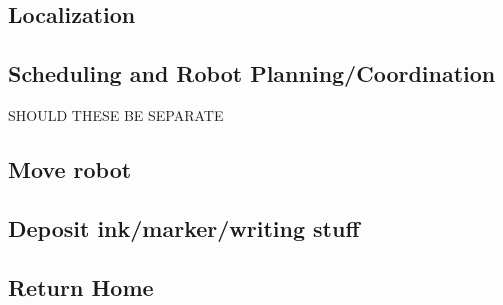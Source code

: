\subsection{Localization}

\subsection{Scheduling and Robot Planning/Coordination}
SHOULD THESE BE SEPARATE

\subsection{Move robot}

\subsection{Deposit ink/marker/writing stuff}

\subsection{Return Home}




